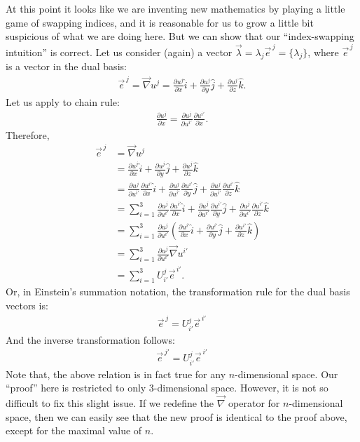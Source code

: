 \documentclass{article}
\theoremstyle{definition}
\begin{document}
At this point it looks like we are inventing new mathematics by playing a little game of swapping indices, and it is reasonable for us to grow a little bit suspicious of what we are doing here. But we can show that our ``index-swapping intuition'' is correct. Let us consider (again) a vector $\vec{\lambda} = \lambda_j\vec{e}^{\,j} = \{ \lambda_j\}$, where $\vec{e}^{\,j}$ is a vector in the dual basis:
\begin{align*}
\vec{e}^{\,j} = \vec{\nabla}u^j = \frac{\partial u^j}{\partial x}\hat{i} + \frac{\partial u^j}{\partial y}\hat{j} + \frac{\partial u^j}{\partial z}\hat{k}.
\end{align*}
Let us apply to chain rule:
\begin{align*}
\frac{\partial u^j}{\partial x} = \frac{\partial u^j}{\partial u^{i'}}\frac{\partial u^{i'}}{\partial x}.
\end{align*}
Therefore,
\begin{align*}
\vec{e}^{\,j} &= \vec{\nabla}u^j\\
&= \frac{\partial u^j}{\partial x}\hat{i} + \frac{\partial u^j}{\partial y}\hat{j} + \frac{\partial u^j}{\partial z}\hat{k}\\
&= \frac{\partial u^j}{\partial u^{i'}}\frac{\partial u^{i'}}{\partial x}\hat{i} + \frac{\partial u^j}{\partial u^{i'}}\frac{\partial u^{i'}}{\partial y}\hat{j} + \frac{\partial u^j}{\partial u^{i'}}\frac{\partial u^{i'}}{\partial z}\hat{k}\\
&= \sum_{i=1}^{3}\frac{\partial u^j}{\partial u^{i'}}\frac{\partial u^{i'}}{\partial x}\hat{i} + \frac{\partial u^j}{\partial u^{i'}}\frac{\partial u^{i'}}{\partial y}\hat{j} + \frac{\partial u^j}{\partial u^{i'}}\frac{\partial u^{i'}}{\partial z}\hat{k}\\
&= \sum_{i=1}^{3}\frac{\partial u^j}{\partial u^{i'}}\left( \frac{\partial u^{i'}}{\partial x}\hat{i} + \frac{\partial u^{i'}}{\partial y}\hat{j} + \frac{\partial u^{i'}}{\partial z}\hat{k}\right) \\
&= \sum_{i=1}^{3}\frac{\partial u^j}{\partial u^{i'}}\vec{\nabla}u^{i'}\\
&= \sum_{i=1}^{3}U^{j}_{i'}\vec{e}^{\,i'}.
\end{align*}
Or, in Einstein's summation notation, the transformation rule for the dual basis vectors is:
\begin{align*}
\boxed{\vec{e}^{\,j} = U^j_{i'}\vec{e}^{\,i'}}
\end{align*}
And the inverse transformation follows:
\begin{align*}
\boxed{\vec{e}^{\,j'} = U^{j}_{i'}\vec{e}^{\,i'}}
\end{align*}
Note that, the above relation is in fact true for any $n$-dimensional space. Our ``proof'' here is restricted to only 3-dimensional space. However, it is not so difficult to fix this slight issue. If we redefine the $\vec{\nabla}$ operator for $n$-dimensional space, then we can easily see that the new proof is identical to the proof above, except for the maximal value of $n$. \\
\end{document}
